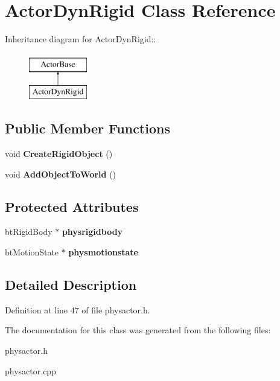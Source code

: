 \hypertarget{classActorDynRigid}{
\section{ActorDynRigid Class Reference}
\label{d4/d0e/classActorDynRigid}
}
Inheritance diagram for ActorDynRigid::\begin{figure}[H]
\begin{center}
\leavevmode
\includegraphics[height=2cm]{d4/d0e/classActorDynRigid}
\end{center}
\end{figure}
\subsection*{Public Member Functions}
\begin{DoxyCompactItemize}
\item 
\hypertarget{classActorDynRigid_aa537dd154a64e34d5c08f660affc4300}{
void {\bfseries CreateRigidObject} ()}
\label{d4/d0e/classActorDynRigid_aa537dd154a64e34d5c08f660affc4300}

\item 
\hypertarget{classActorDynRigid_a5677d046cf6d0bbc6992b93e10290e6c}{
void {\bfseries AddObjectToWorld} ()}
\label{d4/d0e/classActorDynRigid_a5677d046cf6d0bbc6992b93e10290e6c}

\end{DoxyCompactItemize}
\subsection*{Protected Attributes}
\begin{DoxyCompactItemize}
\item 
\hypertarget{classActorDynRigid_a83a6cb758304431043c6bfa05b47ecb2}{
btRigidBody $\ast$ {\bfseries physrigidbody}}
\label{d4/d0e/classActorDynRigid_a83a6cb758304431043c6bfa05b47ecb2}

\item 
\hypertarget{classActorDynRigid_a25c39b4f28cb2516511838a66f6eb3d8}{
btMotionState $\ast$ {\bfseries physmotionstate}}
\label{d4/d0e/classActorDynRigid_a25c39b4f28cb2516511838a66f6eb3d8}

\end{DoxyCompactItemize}


\subsection{Detailed Description}


Definition at line 47 of file physactor.h.

The documentation for this class was generated from the following files:\begin{DoxyCompactItemize}
\item 
physactor.h\item 
physactor.cpp\end{DoxyCompactItemize}
